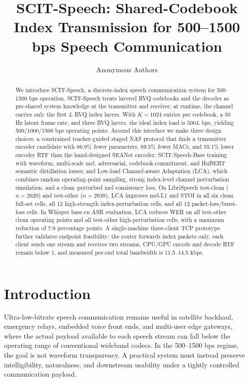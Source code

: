 \documentclass[10pt,twocolumn]{article}
\title{SCIT-Speech: Shared-Codebook Index Transmission for 500--1500 bps Speech Communication}
\author{Anonymous Authors}
\date{}
\newcommand{\method}{SCIT-Speech}
\newcommand{\base}{SCIT-Speech-Base}
\begin{document}
\maketitle

\begin{abstract}
We introduce \method, a discrete-index speech communication system for 500--1500 bps operation. \method{} treats layered RVQ codebooks and the decoder as pre-shared system knowledge at the transmitter and receiver; at runtime, the channel carries only the first \(L\) RVQ index layers. With \(K=1024\) entries per codebook, a 50 Hz latent frame rate, and three RVQ layers, the ideal index load is \(500L\) bps, yielding 500/1000/1500 bps operating points. Around this interface we make three design choices: a constrained teacher-guided staged NAS protocol that finds a transmitter encoder candidate with 86.9\% fewer parameters, 89.5\% fewer MACs, and 55.1\% lower encoder RTF than the hand-designed SEANet encoder; \base{} training with waveform, multi-scale mel, adversarial, codebook-commitment, and HuBERT semantic distillation losses; and Low-load Channel-aware Adaptation (LCA), which combines random operating-point sampling, strong index-level channel perturbation simulation, and a clean--perturbed mel consistency loss. On LibriSpeech test-clean (\(n=2620\)) and test-other (\(n=2939\)), LCA improves mel-L1 and STOI in all six clean full-set cells, all 12 high-strength index-perturbation cells, and all 12 packet-loss/burst-loss cells. In Whisper base.en ASR evaluation, LCA reduces WER on all test-other clean operating points and all test-other high-perturbation cells, with a maximum reduction of 7.9 percentage points. A single-machine three-client TCP prototype further validates endpoint feasibility: the router forwards index packets only, each client sends one stream and receives two streams, CPU/GPU encode and decode RTF remain below 1, and measured per-end total bandwidth is 11.5--14.5 kbps.
\end{abstract}

\section{Introduction}

Ultra-low-bitrate speech communication remains useful in satellite backhaul, emergency relays, embedded voice front ends, and multi-user edge gateways, where the actual payload available to each speech stream can fall below the operating range of conventional wideband codecs. In the 500--1500 bps regime, the goal is not waveform transparency. A practical system must instead preserve intelligibility, naturalness, and downstream usability under a tightly controlled communication payload.
\end{document}
